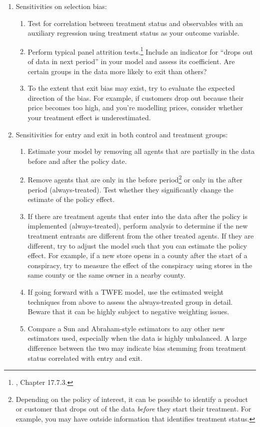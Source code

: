 \documentclass[12pt]{article}
\begin{document}
\begin{enumerate}
    \item Sensitivities on selection bias:
    \begin{enumerate}
        \item Test for correlation between treatment status and observables with an auxiliary regression using treatment status as your outcome variable.
        \item Perform typical panel attrition tests.\footnote{\citet{wooldridge2010a}, Chapter 17.7.3.}  Include an indicator for “drops out of data in next period” in your model and assess its coefficient. Are certain groups in the data more likely to exit than others?
        \item To the extent that exit bias may exist, try to evaluate the expected direction of the bias. For example, if customers drop out because their price becomes too high, and you’re modelling prices, consider whether your treatment effect is underestimated.
    \end{enumerate}
    \item Sensitivities for entry and exit in both control and treatment groups:
    \begin{enumerate}
        \item Estimate your model by removing all agents that are partially in the data before and after the policy date.
        \item Remove agents that are only in the before period\footnote{Depending on the policy of interest, it can be possible to identify a product or customer that drops out of the data \textit{before} they start their treatment. For example, you may have outside information that identifies treatment status.} or only in the after period (always-treated). Test whether they significantly change the estimate of the policy effect.
        \item If there are treatment agents that enter into the data after the policy is implemented (always-treated), perform analysis to determine if the new treatment entrants are different from the other treated agents. If they are different, try to adjust the model such that you can estimate the policy effect. For example, if a new store opens in a county after the start of a conspiracy, try to measure the effect of the conspiracy using stores in the same county or the same owner in a nearby county.
        \item If going forward with a TWFE model, use the estimated weight techniques from above to assess the always-treated group in detail. Beware that it can be highly subject to negative weighting issues.
        \item Compare a Sun and Abraham-style estimators to any other new estimators used, especially when the data is highly unbalanced. A large difference between the two may indicate bias stemming from treatment status correlated with entry and exit.
    \end{enumerate}
\end{enumerate}
\newpage
\end{document}
